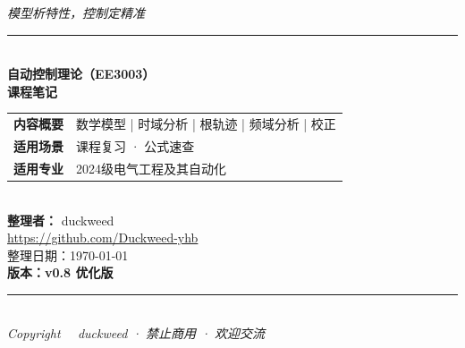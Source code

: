 
\begin{titlepage}
    \centering
    
    \vspace*{0.1\textheight}
    
    {\Large \itshape 模型析特性，控制定精准}\\[0.6cm]
    \rule{\textwidth}{1pt}\\[1cm]
    
    {\Huge \bfseries 自动控制理论（EE3003）}\\[10pt]
    {\LARGE \bfseries 课程笔记}\\[1.2cm]
    
    \renewcommand{\arraystretch}{1.2}
    \begin{tabular}{@{}ll@{}}
        \textbf{内容概要} & 数学模型 | 时域分析 | 根轨迹 | 频域分析 | 校正 \\
        \textbf{适用场景} & 课程复习 · 公式速查 \\
        \textbf{适用专业} & 2024级电气工程及其自动化 \\
    \end{tabular}\\[1.5cm]
    
    {\Large \textbf{整理者：} duckweed}\\[5pt]
    {\large \url{https://github.com/Duckweed-yhb}}\\[1cm]
    
    {\large 整理日期：\today}\\[0.5cm]
    {\large \textbf{版本：v0.8 优化版}}\\[0.5cm]
    
    \rule{\textwidth}{0.5pt}\\[0.3cm]
    {\small \itshape Copyright \textcopyright \ \the\year\ duckweed · 禁止商用 · 欢迎交流}
    
    \vfill
    \restoregeometry
\end{titlepage}

